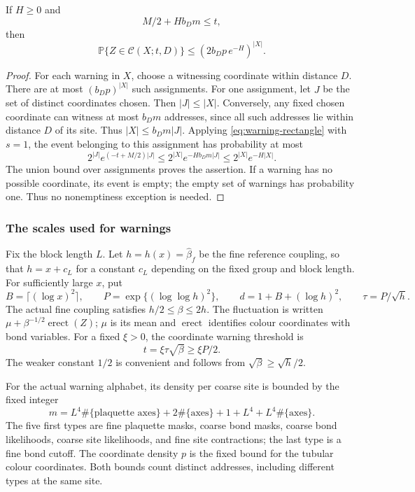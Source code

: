 \begin{proposition}\label{prop:warning-crowding}
If $H\ge0$ and
\begin{equation}\label{eq:warning-threshold}
 M/2+H b_Dm\le t,
\end{equation}
then
\begin{equation}\label{eq:warning-joint}
 \mathbb P\{Z\in\mathcal C(X;t,D)\}
 \le (2b_Dp\,e^{-H})^{|X|}.
\end{equation}
\end{proposition}
\begin{proof}
For each warning in $X$, choose a witnessing coordinate within distance
$D$. There are at most $(b_Dp)^{|X|}$ such assignments. For one assignment,
let $J$ be the set of distinct coordinates chosen. Then $|J|\le|X|$.
Conversely, any fixed chosen coordinate can witness at most $b_Dm$
addresses, since all such addresses lie within distance $D$ of its site.
Thus $|X|\le b_Dm|J|$. Applying \eqref{eq:warning-rectangle} with $s=1$,
the event belonging to this assignment has probability at most
\[
 2^{|J|}e^{(-t+M/2)|J|}
 \le 2^{|X|}e^{-Hb_Dm|J|}
 \le 2^{|X|}e^{-H|X|}.
\]
The union bound over assignments proves the assertion. If a warning
has no possible coordinate, its event is empty; the empty set of
warnings has probability one. Thus no nonemptiness exception is needed.
\end{proof}

\subsubsection{The scales used for warnings}
Fix the block length $L$. Let $h=h(x)=\widehat\beta_f$ be the fine
reference coupling, so that $h=x+c_L$ for a constant $c_L$ depending
on the fixed group and block length. For sufficiently large $x$, put
\begin{equation}\label{eq:warning-scales}
 B=\lceil(\log x)^2\rceil,\qquad
 P=\exp\{(\log\log h)^2\},\qquad
 d=1+B+(\log h)^2,\qquad \tau=P/\sqrt h.
\end{equation}
The actual fine coupling satisfies $h/2\le\beta\le2h$.
The fluctuation is written
$\mu+\beta^{-1/2}\operatorname{erect}(Z)$; $\mu$ is its mean and
$\operatorname{erect}$ identifies colour coordinates with bond variables.
For a fixed $\xi>0$, the coordinate warning threshold is
\[
 t=\xi\tau\sqrt\beta\ge \xi P/2.
\]
The weaker constant $1/2$ is convenient and follows from
$\sqrt\beta\ge\sqrt h/2$.

For the actual warning alphabet, its density per coarse site is bounded
by the fixed integer
\[
 m=L^4\#\{\text{plaquette axes}\}
       +2\#\{\text{axes}\}+1+L^4
       +L^4\#\{\text{axes}\}.
\]
The five first types are fine plaquette masks, coarse bond masks,
coarse bond likelihoods, coarse site likelihoods, and fine site
contractions; the last type is a fine bond cutoff. The coordinate
density $p$ is the fixed bound for the tubular colour coordinates.
Both bounds count distinct addresses, including different types at the
same site.

